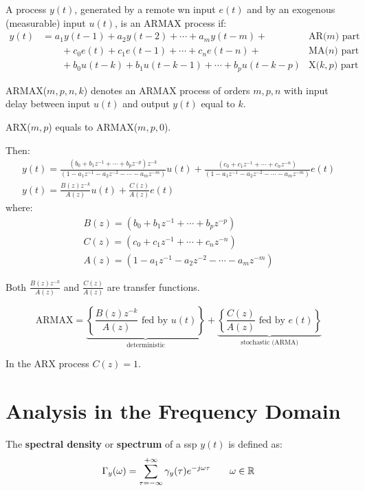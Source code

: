 A process $y(t)$, generated by a remote \gls{wn} input $e(t)$ and by an exogenous (measurable) input $u(t)$, is an ARMAX process if:
\begin{align*}
	y(t)&=a_{1} y(t-1)+a_{2} y(t-2)+\cdots+a_{m} y(t-m)+ &\text{AR($m$) part}\\
	&\qquad+c_{0} e(t)+c_{1} e(t-1)+\cdots+c_{n} e(t-n)+ &\text{MA($n$) part} \\
	&\qquad+b_{0} u(t-k)+b_{1} u(t-k-1)+\cdots+b_{p} u(t-k-p)  &\text{X($k,p$) part}
\end{align*}

ARMAX($m,p,n,k$) denotes an ARMAX process of orders $m,p,n$ with input delay between input $u(t)$ and output $y(t)$ equal to $k$.

ARX($m,p$) equals to ARMAX($m,p,0$).

Then:
\begin{gather*}
	y(t) = \frac{\left(b_{0}+b_{1} z^{-1}+\cdots+b_{p} z^{-p}\right) z^{-k}}{\left(1-a_{1} z^{-1}-a_{2} z^{-2}-\cdots-a_{m} z^{-m}\right)} u(t)+\frac{\left(c_{0}+c_{1} z^{-1}+\cdots+c_{n} z^{-n}\right)}{\left(1-a_{1} z^{-1}-a_{2} z^{-2}-\cdots-a_{m} z^{-m}\right)} e(t)\\
	\boxed{y(t)=\frac{B(z) z^{-k}}{A(z)} u(t)+\frac{C(z)}{A(z)} e(t)}
\end{gather*}
where:
\begin{gather*}
	\boxed{B(z) = \left(b_{0}+b_{1} z^{-1}+\cdots+b_{p} z^{-p}\right)}\\
	\boxed{C(z) = \left(c_{0}+c_{1} z^{-1}+\cdots+c_{n} z^{-n}\right)}\\
	\boxed{A(z) = \left(1-a_{1} z^{-1}-a_{2} z^{-2}-\cdots-a_{m} z^{-m}\right)}
\end{gather*}

Both $\frac{B(z) z^{-k}}{A(z)}$ and $\frac{C(z)}{A(z)}$ are transfer functions.

\[
	\text{ARMAX}=\underbrace{\left\{ \frac{B(z) z^{-k}}{A(z)} \text{ fed by } u(t) \right\}}_{\text{deterministic}} + \underbrace{\left\{ \frac{C(z)}{A(z)} \text{ fed by } e(t) \right\}  }_{\text{stochastic (ARMA)}}
\]

In the ARX process $C(z)=1$.

\chapter{Analysis in the Frequency Domain}
\begin{definition}
	The \textbf{spectral density} or \textbf{spectrum} of a \gls{ssp} $y(t)$ is defined as:
	\[
		\Gamma_{y}(\omega)=\sum_{\tau=-\infty}^{+\infty} \gamma_{y}(\tau) e^{-j \omega \tau} \qquad \omega \in \mathbb{R}
	\]
\end{definition}

